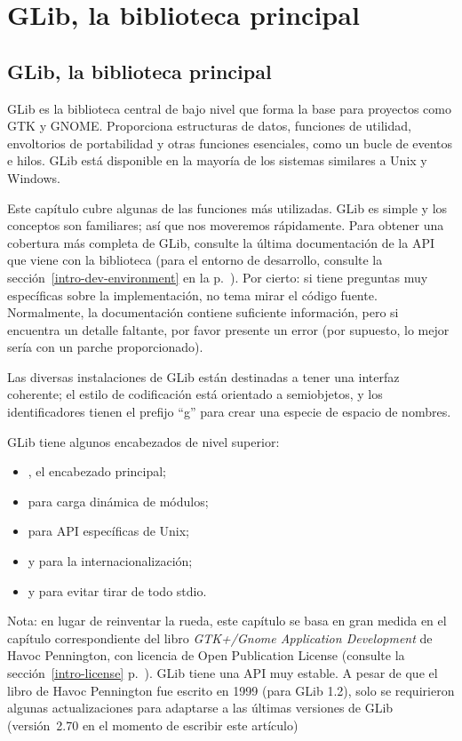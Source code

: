 \part{GLib, la biblioteca principal\label{glib}}

\chapter{GLib, la biblioteca principal}

GLib es la biblioteca central de bajo nivel que forma la base para proyectos como GTK y GNOME. Proporciona estructuras de datos, funciones de utilidad, envoltorios de portabilidad y otras funciones esenciales, como un bucle de eventos e hilos. GLib está disponible en la mayoría de los sistemas similares a Unix y Windows.

Este capítulo cubre algunas de las funciones más utilizadas. GLib es simple y los conceptos son familiares; así que nos moveremos rápidamente. Para obtener una cobertura más completa de GLib, consulte la última documentación de la API que viene con la biblioteca (para el entorno de desarrollo, consulte la sección~\ref{intro-dev-environment} en la p.~\pageref{intro-dev-environment}). Por cierto: si tiene preguntas muy específicas sobre la implementación, no tema mirar el código fuente. Normalmente, la documentación contiene suficiente información, pero si encuentra un detalle faltante, por favor presente un error (por supuesto, lo mejor sería con un parche proporcionado).

Las diversas instalaciones de GLib están destinadas a tener una interfaz coherente; el estilo de codificación está orientado a semiobjetos, y los identificadores tienen el prefijo ``g'' para crear una especie de espacio de nombres.

GLib tiene algunos encabezados de nivel superior:
\begin{itemize}
    \item {}, el encabezado principal;
    \item {} para carga dinámica de módulos;
    \item {} para API específicas de Unix;
    \item {} y  para la internacionalización;
    \item {} y  para evitar tirar de todo stdio.
\end{itemize}

\bigskip
Nota: en lugar de reinventar la rueda, este capítulo se basa en gran medida en el capítulo correspondiente del libro \emph{GTK+/Gnome Application Development} de Havoc Pennington, con licencia de Open Publication License (consulte la sección~\ref{intro-license} p.~\pageref{intro-license}). GLib tiene una API muy estable. A pesar de que el libro de Havoc Pennington fue escrito en 1999 (para GLib 1.2), solo se requirieron algunas actualizaciones para adaptarse a las últimas versiones de GLib (versión~2.70 en el momento de escribir este artículo)

